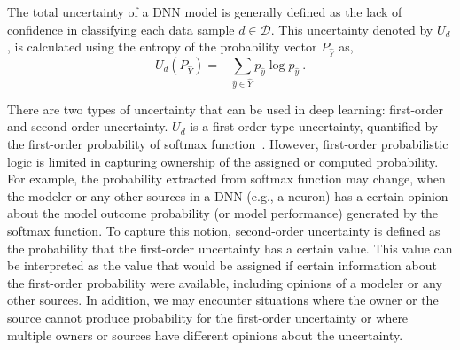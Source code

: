 The total uncertainty of a DNN model is generally defined as the lack of confidence in classifying each data sample $d \in \mathcal{D}$. This uncertainty denoted by $U_{d}$, is calculated using the entropy of the probability vector $P_{\hat{Y}}$ as,
\begin{equation}
U_{d}(P_{\hat{Y}}) = - \sum_{\hat{y} \in \hat{Y}} p_{\hat{y}}\log p_{\hat{y}}\ .
\label{entropy}
\end{equation}

There are two types of uncertainty that can be used in deep learning: first-order and second-order uncertainty. %
$U_{d}$ is a first-order type uncertainty, quantified by the first-order probability of softmax function~\cite{uncer4,uncer5}. 
However, first-order probabilistic logic is limited in capturing ownership of the assigned or computed probability. For example, the probability extracted from softmax function may change, when the modeler or any other sources in a DNN (e.g., a neuron) has a certain opinion about the model outcome probability (or model performance) generated by the softmax function. To capture this notion, second-order uncertainty is defined as the probability  %
that the first-order uncertainty has a certain value. This value can be interpreted as the value that would be assigned if certain information about the first-order probability were available, including opinions of a modeler or any other sources. In addition, we may encounter situations where the owner or the source cannot produce probability for the first-order uncertainty or where multiple owners or sources have different opinions about the uncertainty. 








